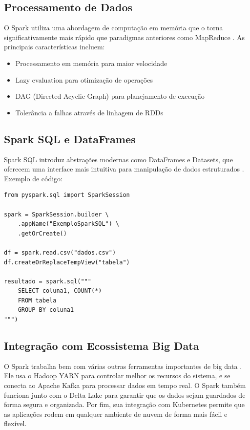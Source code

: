 \subsection{Processamento de Dados}
O Spark utiliza uma abordagem de computação em memória que o torna significativamente mais rápido que paradigmas anteriores como MapReduce \cite{chambers2023spark}. As principais características incluem:

\begin{itemize}
    \item Processamento em memória para maior velocidade
    \item Lazy evaluation para otimização de operações
    \item DAG (Directed Acyclic Graph) para planejamento de execução
    \item Tolerância a falhas através de linhagem de RDDs
\end{itemize}

\subsection{Spark SQL e DataFrames}
Spark SQL introduz abstrações modernas como DataFrames e Datasets, que oferecem uma interface mais intuitiva para manipulação de dados estruturados \cite{armbrust2023spark}. Exemplo de código:

\begin{verbatim}
from pyspark.sql import SparkSession

spark = SparkSession.builder \
    .appName("ExemploSparkSQL") \
    .getOrCreate()

df = spark.read.csv("dados.csv")
df.createOrReplaceTempView("tabela")

resultado = spark.sql("""
    SELECT coluna1, COUNT(*)
    FROM tabela
    GROUP BY coluna1
""")
\end{verbatim}

\subsection{Integração com Ecossistema Big Data}
O Spark trabalha bem com várias outras ferramentas importantes de big data \cite{wendell2023definitive}. Ele usa o Hadoop YARN 
para controlar melhor os recursos do sistema, e se conecta ao Apache Kafka para processar dados em tempo real. O Spark também 
funciona junto com o Delta Lake para garantir que os dados sejam guardados de forma segura e organizada. Por fim, sua integração 
com Kubernetes permite que as aplicações rodem em qualquer ambiente de nuvem de forma mais fácil e flexível.

